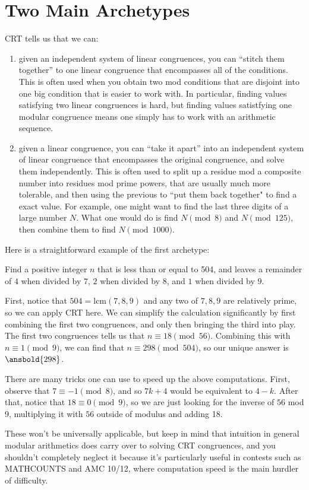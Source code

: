 \documentclass[mast]{lucky}
\begin{document}
\section{Two Main Archetypes}
CRT tells us that we can:
\begin{enumerate}
\item given an independent system of linear congruences, you can ``stitch them together'' to one linear congruence that encompasses all of the conditions. This is often used when you obtain two mod conditions that are disjoint into one big condition that is easier to work with. In particular, finding values satisfying two linear congruences is hard, but finding values satistfying one modular congruence means one simply has to work with an arithmetic sequence.
\item given a linear congruence, you can ``take it apart'' into an independent system of linear congruence that encompasses the original congruence, and solve them independently. This is often used to split up a residue mod a composite number into residues mod prime powers, that are usually much more tolerable, and then using the previous to ``put them back together" to find a exact value. For example, one might want to find the last three digits of a large number $N$. What one would do is find $N \pmod{8}$ and $N \pmod{125}$, then combine them to find $N\pmod{1000}$.
\end{enumerate}

Here is a straightforward example of the first archetype:
\begin{exam}
Find a positive integer $n$ that is less than or equal to 504, and leaves a remainder of $4$ when divided by $7$, $2$ when divided by $8$, and $1$ when divided by $9$.
\end{exam}
\begin{sol}
First, notice that $504=\text{lcm}(7,8,9)$ and any two of $7,8,9$ are relatively prime, so we can apply CRT here. We can simplify the calculation significantly by first combining the first two congruences, and only then bringing the third into play.
The first two congruences tells us that $n\equiv 18\pmod{56}$. Combining this with $n\equiv 1\pmod{9}$, we can find that $n\equiv 298\pmod{504}$, so our unique answer is $\ansbold{298}$.
\end{sol}
\begin{remark}
There are many tricks one can use to speed up the above computations. First, observe that $7\equiv -1\pmod{8}$, and so $7k+4$ would be equivalent to $4-k$. After that, notice that $18\equiv 0\pmod{9}$, so we are just looking for the inverse of $56$ mod 9, multiplying it with $56$ outside of modulus and adding 18.

These won't be universally applicable, but keep in mind that intuition in general modular arithmetics does carry over to solving CRT congruences, and you shouldn't completely neglect it because it's particularly useful in contests such as MATHCOUNTS and AMC 10/12, where computation speed is the main hurdler of difficulty.
\end{remark}
\end{document}
